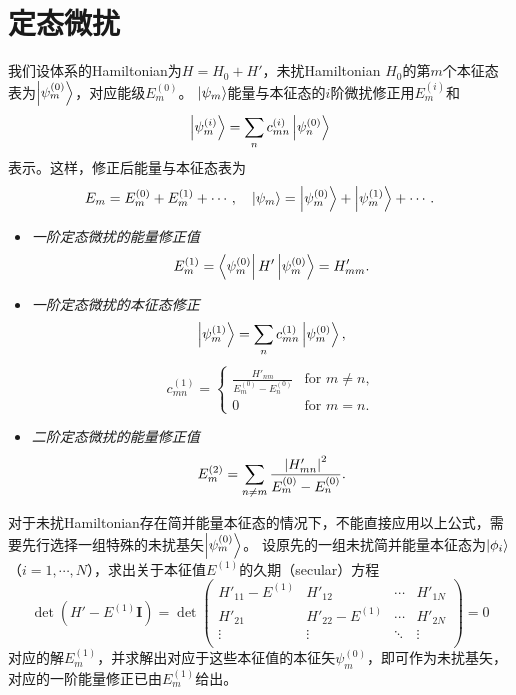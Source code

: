 \section{定态微扰}

我们设体系的Hamiltonian为$H=H_0+H'$，未扰Hamiltonian $H_0$的第$m$个本征态表为$\ket{\psi_m^{(0)}}$，对应能级$E_m^{(0)}$。
$\ket{\psi_m}$能量与本征态的$i$阶微扰修正用$E_m^{(i)}$和
\begin{equation}
    \ket{\psi_m^{(i)}} = \sum_n c_{mn}^{(i)} \ket{\psi_n^{(0)}}
\end{equation}
表示。这样，修正后能量与本征态表为
\begin{equation}
    E_m=E_m^{(0)}+E_m^{(1)}+\cdots, \quad \ket{\psi_m}=\ket{\psi_m^{(0)}}+\ket{\psi_m^{(1)}}+\cdots.
\end{equation}

\begin{itemize}
    \item \emph{一阶定态微扰的能量修正值}
    \begin{equation}
        E_m^{(1)} = \bra{\psi_m^{(0)}}H'\ket{\psi_m^{(0)}} = H'_{mm}.
    \end{equation}
    \item \emph{一阶定态微扰的本征态修正}
    \begin{equation}
        \ket{\psi_m^{(1)}} = \sum_n c_{mn}^{(1)} \ket{\psi_m^{(0)}},
    \end{equation}
    \begin{equation}
        c_{mn}^{(1)} = \begin{cases}
            \frac{H'_{nm}}{E_m^{(0)}-E_n^{(0)}} & \text{for } m \neq n, \\
            0 & \text{for } m = n.
        \end{cases}
    \end{equation}
    \item \emph{二阶定态微扰的能量修正值}
    \begin{equation}
        E_m^{(2)} = \sum_{n\ne m} \frac{\abs{H'_{mn}}^2}{E_m^{(0)}-E_n^{(0)}}.
    \end{equation}
\end{itemize}

对于未扰Hamiltonian存在简并能量本征态的情况下，不能直接应用以上公式，需要先行选择一组特殊的未扰基矢$\ket{\psi_m^{(0)}}$。
设原先的一组未扰简并能量本征态为$\ket{\phi_i}$（$i=1,\cdots,N$），求出关于本征值$E^{(1)}$的久期（secular）方程
\begin{equation}
    \det \left(H' - E^{(1)}\mathbf{I} \right) =
    \det \begin{pmatrix}
        H'_{11}-E^{(1)} & H'_{12} & \cdots & H'_{1N} \\
        H'_{21} & H'_{22}-E^{(1)} & \cdots & H'_{2N} \\
        \vdots & \vdots & \ddots & \vdots \\
    \end{pmatrix} = 0
\end{equation}
对应的解$E_m^{(1)}$，并求解出对应于这些本征值的本征矢$\psi_m^{(0)}$，即可作为未扰基矢，对应的一阶能量修正已由$E_m^{(1)}$给出。
